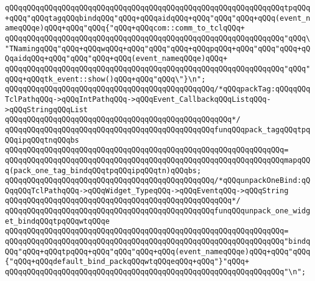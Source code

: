 \verb|qQQqqQQqqQQqqQQqqQQqqQQqqQQqqQQqqQQqqQQqqQQqqQQqqQQqqQQqqQQqqQQqtpqQQq+qQQq"qQQqtagqQQqbindqQQq"qQQq+qQQqaidqQQq+qQQq"qQQq"qQQq+qQQq(event_nameqQQqe)qQQq+qQQq"qQQq{"qQQq+qQQqcom::comm_to_tclqQQq+|\newline
\verb|qQQqqQQqqQQqqQQqqQQqqQQqqQQqqQQqqQQqqQQqqQQqqQQqqQQqqQQqqQQqqQQq"qQQq\"TNamingqQQq"qQQq+qQQqwqQQq+qQQq"qQQq"qQQq+qQQqpqQQq+qQQq"qQQq"qQQq+qQQqaidqQQq+qQQq"qQQq"qQQq+qQQq(event_nameqQQqe)qQQq+|\newline
\verb|qQQqqQQqqQQqqQQqqQQqqQQqqQQqqQQqqQQqqQQqqQQqqQQqqQQqqQQqqQQqqQQq"qQQq"qQQq+qQQqtk_event::show()qQQq+qQQq"qQQq\"}\n";|\newline
\newline
\newline
\newline
\verb|qQQqqQQqqQQqqQQqqQQqqQQqqQQqqQQqqQQqqQQqqQQqqQQq/*qQQqpackTag:qQQqqQQqTclPathqQQq->qQQqIntPathqQQq->qQQqEvent_CallbackqQQqListqQQq->qQQqStringqQQqList|\newline
\verb|qQQqqQQqqQQqqQQqqQQqqQQqqQQqqQQqqQQqqQQqqQQqqQQqqQQq*/|\newline
\verb|qQQqqQQqqQQqqQQqqQQqqQQqqQQqqQQqqQQqqQQqqQQqqQQqfunqQQqpack_tagqQQqtpqQQqipqQQqtnqQQqbs|\newline
\verb|qQQqqQQqqQQqqQQqqQQqqQQqqQQqqQQqqQQqqQQqqQQqqQQqqQQqqQQqqQQqqQQq=|\newline
\verb|qQQqqQQqqQQqqQQqqQQqqQQqqQQqqQQqqQQqqQQqqQQqqQQqqQQqqQQqqQQqqQQqmapqQQq(pack_one_tag_bindqQQqtpqQQqipqQQqtn)qQQqbs;|\newline
\newline
\newline
\newline
\verb|qQQqqQQqqQQqqQQqqQQqqQQqqQQqqQQqqQQqqQQqqQQqqQQq/*qQQqunpackOneBind:qQQqqQQqTclPathqQQq->qQQqWidget_TypeqQQq->qQQqEventqQQq->qQQqString|\newline
\verb|qQQqqQQqqQQqqQQqqQQqqQQqqQQqqQQqqQQqqQQqqQQqqQQqqQQq*/|\newline
\verb|qQQqqQQqqQQqqQQqqQQqqQQqqQQqqQQqqQQqqQQqqQQqqQQqfunqQQqunpack_one_widget_bindqQQqtpqQQqwtqQQqe|\newline
\verb|qQQqqQQqqQQqqQQqqQQqqQQqqQQqqQQqqQQqqQQqqQQqqQQqqQQqqQQqqQQqqQQq=|\newline
\verb|qQQqqQQqqQQqqQQqqQQqqQQqqQQqqQQqqQQqqQQqqQQqqQQqqQQqqQQqqQQqqQQq"bindqQQq"qQQq+qQQqtpqQQq+qQQq"qQQq"qQQq+qQQq(event_nameqQQqe)qQQq+qQQq"qQQq{"qQQq+qQQqdefault_bind_packqQQqwtqQQqeqQQq+qQQq"}"qQQq+|\newline
\verb|qQQqqQQqqQQqqQQqqQQqqQQqqQQqqQQqqQQqqQQqqQQqqQQqqQQqqQQqqQQqqQQq"\n";|\newline
